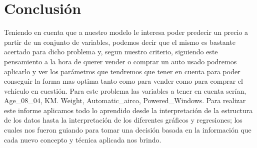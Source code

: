 \documentclass[
]{article}
\begin{document}
\hypertarget{conclusiuxf3n}{%
\section{Conclusión}\label{conclusiuxf3n}}

Teniendo en cuenta que a nuestro modelo le interesa poder predecir un
precio a partir de un conjunto de variables, podemos decir que el mismo
es bastante acertado para dicho problema y, segun nuestro criterio,
siguiendo este pensamiento a la hora de querer vender o comprar un auto
usado podremos aplicarlo y ver los parámetros que tendremos que tener en
cuenta para poder conseguir la forma mas optima tanto como para vender
como para comprar el vehículo en cuestión. Para este problema las
variables a tener en cuenta serían, Age\_08\_04, KM. Weight,
Automatic\_airco, Powered\_Windows. Para realizar este informe aplicamos
todo lo aprendido desde la interpretación de la estructura de los datos
hasta la interpretación de los diferentes gráficos y regresiones; los
cuales nos fueron guiando para tomar una decisión basada en la
información que cada nuevo concepto y técnica aplicada nos brindo.
\end{document}
